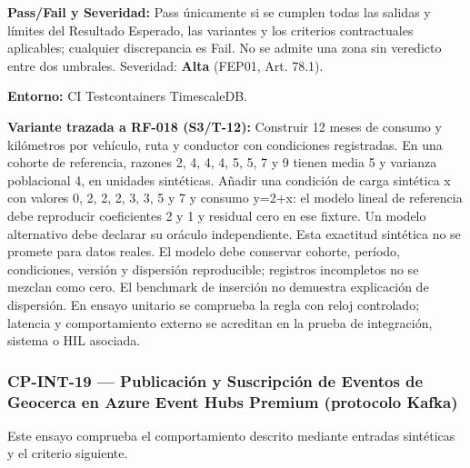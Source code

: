 \par\noindent\textbf{Pass/Fail y Severidad:} Pass únicamente si se cumplen todas las salidas y límites del Resultado Esperado, las variantes y los criterios contractuales aplicables; cualquier discrepancia es Fail. No se admite una zona sin veredicto entre dos umbrales. Severidad: \textbf{Alta} (FEP01, Art. 78.1).\par
\par\noindent\textbf{Entorno:} CI Testcontainers TimescaleDB.\par







\par\noindent\textbf{Variante trazada a RF-018 (S3/T-12):} Construir 12 meses de consumo y kilómetros por vehículo, ruta y conductor con condiciones registradas. En una cohorte de referencia, razones 2, 4, 4, 4, 5, 5, 7 y 9 tienen media 5 y varianza poblacional 4, en unidades sintéticas. Añadir una condición de carga sintética x con valores 0, 2, 2, 2, 3, 3, 5 y 7 y consumo y=2+x: el modelo lineal de referencia debe reproducir coeficientes 2 y 1 y residual cero en ese fixture. Un modelo alternativo debe declarar su oráculo independiente. Esta exactitud sintética no se promete para datos reales. El modelo debe conservar cohorte, período, condiciones, versión y dispersión reproducible; registros incompletos no se mezclan como cero. El benchmark de inserción no demuestra explicación de dispersión. En ensayo unitario se comprueba la regla con reloj controlado; latencia y comportamiento externo se acreditan en la prueba de integración, sistema o HIL asociada.\par
\subsubsection*{CP-INT-19 — Publicación y Suscripción de Eventos de Geocerca en Azure Event Hubs Premium (protocolo Kafka)}\label{sec:9-cp-int-19}
Este ensayo comprueba el comportamiento descrito mediante entradas sintéticas y el criterio siguiente.

